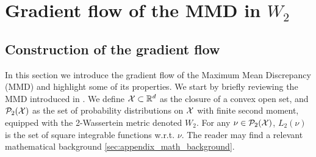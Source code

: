 
\section{Gradient flow of the MMD in $W_2$}\label{sec:gradient_flow}
\subsection{Construction of the gradient flow}
In this section we introduce the gradient flow of the Maximum Mean Discrepancy (MMD) and highlight some of its properties. We start by briefly reviewing the MMD introduced in \cite{gretton2012kernel}. %
We define ${{\mathcal X}}\subset{{\mathbb R}}^d$ as the closure of a convex open set, and $\mathcal{P}_2({{\mathcal X}})$ as the set of probability distributions on ${{\mathcal X}}$ with finite second moment, equipped with the 2-Wassertein metric denoted $W_2$. For any $\nu \in \mathcal{P}_2({{\mathcal X}})$, $L_2(\nu)$ is the set of square integrable functions w.r.t. $\nu$. The reader may find a relevant mathematical background \cref{sec:appendix_math_background}. 


